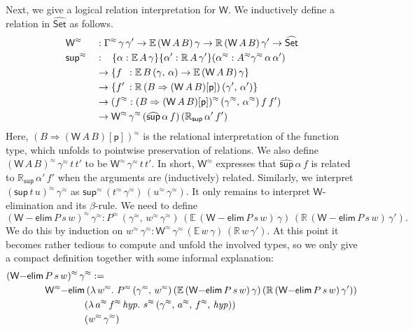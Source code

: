 \documentclass[acmsmall,screen]{acmart}
\newcommand{\msf}[1]{{\mathsf{#1}}}
\newcommand{\mbb}[1]{\mathbb{#1}}
\newcommand{\rel}{^{\approx}}
\newcommand{\p}{\mathsf{p}}
\newcommand{\wh}[1]{\widehat{#1}}
\newcommand{\whset}{\wh{\Set}}
\newcommand{\ev}{\mbb{E}}
\newcommand{\re}{\mbb{R}}
\newcommand{\welim}{\vW{-}\msf{elim}}
\newcommand{\vW}{\mathsf{W}}
\newcommand{\vsup}{\mathsf{sup}}
\newcommand{\Set}{\msf{Set}}
\theoremstyle{remark}
\begin{document}
Next, we give a logical relation interpretation for $\vW$. We inductively define
a relation in $\whset$ as follows.
\begin{alignat*}{3}
  & \vW\rel &&: \Gamma\rel\,\gamma\,\gamma' \to \ev\,(\vW\,A\,B)\,\gamma \to \re\,(\vW\,A\,B)\,\gamma' \to \whset\\
  & \vsup\rel &&: \hspace{0.8em}\{\alpha : \ev\,A\,\gamma\}\{\alpha' : \re\,A\,\gamma'\}(\alpha\rel : A\rel \gamma\rel\,\alpha\,\alpha')\\
  &           &&\to \{f \hspace{0.5em}: \ev\,B\,(\gamma,\,\alpha) \to \ev\,(\vW\,A\,B)\,\gamma\}\\
  &           &&\to \{f' \hspace{0.2em}: \re\,(B \Rightarrow (\vW\,A\,B)[\p])\,(\gamma',\,\alpha')\}\\
  &           &&\to (f\rel : (B \Rightarrow (\vW\,A\,B)[\p])\rel\,(\gamma\rel,\,\alpha\rel)\,f\,f')\\
  &           &&\to \vW\rel\,\gamma\rel\,(\wh{\vsup}\,\alpha\,f)\,(\re_\vsup\,\alpha'\,f')
\end{alignat*}
Here, $(B \Rightarrow (\vW\,A\,B)[\p])\rel$ is the relational interpretation of
the function type, which unfolds to pointwise preservation of relations. We also
define $(\vW\,A\,B)\rel\,\gamma\rel\,t\,t'$ to be $\vW\rel\,\gamma\rel\,t\,t'$.
In short, $\vW\rel$ expresses that $\wh{\vsup}\,\alpha\,f$ is related to
$\re_\vsup\,\alpha'\,f'$ when the arguments are (inductively) related. Similarly, we
interpret $(\vsup\,t\,u)\rel\,\gamma\rel$ as
$\vsup\rel\,(t\rel\,\gamma\rel)\,(u\rel\,\gamma\rel)$. It only remains to
interpret $\vW$-elimination and its $\beta$-rule. We need to define
\[ (\vW{-}\msf{elim}\,P\,s\,w)\rel\,\gamma\rel : P\rel\,(\gamma\rel,\,w\rel\,\gamma\rel)\,(\ev\,(\welim\,P\,s\,w)\,\gamma)\,(\re\,(\welim\,P\,s\,w)\,\gamma'). \]
We do this by induction on $w\rel\,\gamma\rel :
\vW\rel\,\gamma\rel\,(\ev\,w\,\gamma)\,(\re\,w\,\gamma')$. At this point it
becomes rather tedious to compute and unfold the involved types, so we only give
a compact definition together with some informal explanation:
\begin{alignat*}{3}
  &(\vW{-}\msf{elim}\,P\,s\,w)\rel\,\gamma\rel :=\\
  &\hspace{4em}\vW\rel{-}\msf{elim}\,(\lambda\,w\rel.\,\,P\rel\,(\gamma\rel,\,w\rel)\,(\ev\,(\welim\,P\,s\,w)\,\gamma)\,(\re\,(\welim\,P\,s\,w)\,\gamma'))\\
  &\hspace{8.1em}(\lambda\,a\rel\,f\rel\,\mathit{hyp}.\,\,s\rel\,(\gamma\rel,\,a\rel,\,f\rel,\,\mathit{hyp}))\\
  &\hspace{8.1em}(w\rel\,\gamma\rel)
\end{alignat*}
\end{document}

